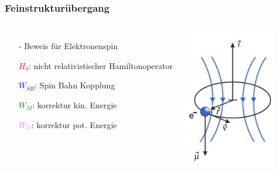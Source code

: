 \begin{frame}
  \frametitle{Feinstrukturübergang}
	\begin{columns}
		\begin{itemize}
		\item[-] Beweis für Elektronenspin 
		\item[]  
		\item[]  \textcolor{red}{$H_0$}: nicht relativistischer Hamiltonoperator
		\item[]  \textcolor{blue}{$W_{SB}$}: Spin Bahn Kopplung
		\item[]  \textcolor{green}{$W_M$}: korrektur kin. Energie
		\item[]  \textcolor{violet}{$W_D$}: korrektur pot. Energie
		
		\end{itemize}
		
		
		\includegraphics[width = 4cm]{./pictures/feinstrukturelektron}
			
	\end{columns}
	
	
	
\end{frame}

